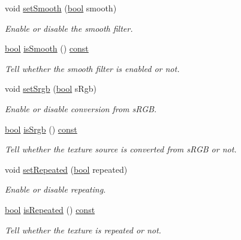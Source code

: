 \begin{DoxyCompactItemize}
void \hyperlink{classsf_1_1_texture_a0c3bd6825b9a99714f10d44179d74324}{set\-Smooth} (\hyperlink{term__entry_8h_a002004ba5d663f149f6c38064926abac}{bool} smooth)
\begin{DoxyCompactList}\small\item\em Enable or disable the smooth filter. \end{DoxyCompactList}\item 
\hyperlink{term__entry_8h_a002004ba5d663f149f6c38064926abac}{bool} \hyperlink{classsf_1_1_texture_a1d6643d3c76f2be29dc401dc22749e16}{is\-Smooth} () \hyperlink{term__entry_8h_a57bd63ce7f9a353488880e3de6692d5a}{const} 
\begin{DoxyCompactList}\small\item\em Tell whether the smooth filter is enabled or not. \end{DoxyCompactList}\item 
void \hyperlink{classsf_1_1_texture_af8a38872c50a33ff074bd0865db19dd4}{set\-Srgb} (\hyperlink{term__entry_8h_a002004ba5d663f149f6c38064926abac}{bool} s\-Rgb)
\begin{DoxyCompactList}\small\item\em Enable or disable conversion from s\-R\-G\-B. \end{DoxyCompactList}\item 
\hyperlink{term__entry_8h_a002004ba5d663f149f6c38064926abac}{bool} \hyperlink{classsf_1_1_texture_a71497736ee0593e493814c32678d981f}{is\-Srgb} () \hyperlink{term__entry_8h_a57bd63ce7f9a353488880e3de6692d5a}{const} 
\begin{DoxyCompactList}\small\item\em Tell whether the texture source is converted from s\-R\-G\-B or not. \end{DoxyCompactList}\item 
void \hyperlink{classsf_1_1_texture_aaa87d1eff053b9d4d34a24c784a28658}{set\-Repeated} (\hyperlink{term__entry_8h_a002004ba5d663f149f6c38064926abac}{bool} repeated)
\begin{DoxyCompactList}\small\item\em Enable or disable repeating. \end{DoxyCompactList}\item 
\hyperlink{term__entry_8h_a002004ba5d663f149f6c38064926abac}{bool} \hyperlink{classsf_1_1_texture_a007a19b48952b7854120bf423c102150}{is\-Repeated} () \hyperlink{term__entry_8h_a57bd63ce7f9a353488880e3de6692d5a}{const} 
\begin{DoxyCompactList}\small\item\em Tell whether the texture is repeated or not. \end{DoxyCompactList}\item 

\end{DoxyCompactItemize}
